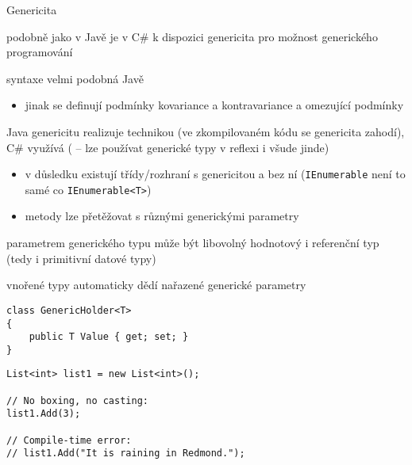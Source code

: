 
\begin{frame}[fragile]
\begin{bitemize}{Genericita}
\item podobně jako v Javě je v C\# k dispozici genericita pro možnost generického programování
\item syntaxe velmi podobná Javě
\begin{itemize}
\item jinak se definují podmínky kovariance a kontravariance a omezující podmínky
\end{itemize}

\item Java genericitu realizuje technikou  (ve zkompilovaném kódu se genericita zahodí), C\# využívá  ( -- lze používat generické typy v reflexi i všude jinde)
\begin{itemize}
\item v důsledku existují třídy/rozhraní s genericitou a bez ní (\lstinline|IEnumerable| není to samé co \lstinline|IEnumerable<T>|)
\item metody lze přetěžovat s různými generickými parametry
\end{itemize}
\item parametrem generického typu může být libovolný hodnotový i referenční typ (tedy i primitivní datové typy)
\item vnořené typy automaticky dědí nařazené generické parametry
\end{bitemize}
\vfill


\end{frame}


\begin{frame}[fragile]
\begin{yesblock}
\begin{lstlisting}
class GenericHolder<T>
{
    public T Value { get; set; }
}
\end{lstlisting}
\end{yesblock}
\vfill
\begin{yesblock}
\begin{lstlisting}
List<int> list1 = new List<int>();

// No boxing, no casting:
list1.Add(3);

// Compile-time error:
// list1.Add("It is raining in Redmond.");
\end{lstlisting}
\end{yesblock}
\end{frame}
